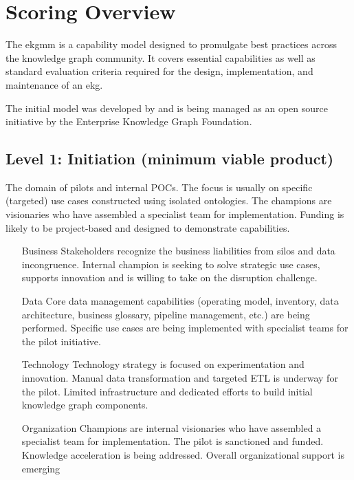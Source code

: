 \section{Scoring Overview}\label{sec:ekg-mm-scoring-overview}

The \gls{ekgmm} is a capability model designed to promulgate best practices across the knowledge graph community.
It covers essential capabilities as well as standard evaluation criteria required for the design, implementation,
and maintenance of an \gls{ekg}.

The initial model was developed by \agnos and is being managed as an open source initiative by the
Enterprise Knowledge Graph Foundation.

\subsection{Level 1:  Initiation (minimum viable product)}

The domain of pilots and internal POCs.
The focus is usually on specific (targeted) use cases constructed using isolated ontologies.
The champions are visionaries who have assembled a specialist team for implementation.
Funding is likely to be project-based and designed to demonstrate capabilities.

\begin{itemize}[leftmargin=1in,font=\bfseries]

    \item[Business]     Stakeholders recognize the business liabilities from silos and data incongruence.
                        Internal champion is seeking to solve strategic use cases, supports innovation and is willing
                        to take on the disruption challenge.
    \item[Data]         Core data management capabilities (operating model, inventory, data architecture, business
                        glossary, pipeline management, etc.) are being performed.
                        Specific use cases are being implemented with specialist teams for the pilot initiative.
    \item[Technology]   Technology strategy is focused on experimentation and innovation.
                        Manual data transformation and targeted ETL is underway for the pilot.
                        Limited infrastructure and dedicated efforts to build initial knowledge graph components.
    \item[Organization] Champions are internal visionaries who have assembled a specialist team for implementation.
                        The pilot is sanctioned and funded.
                        Knowledge acceleration is being addressed.
                        Overall organizational support is emerging

\end{itemize}

